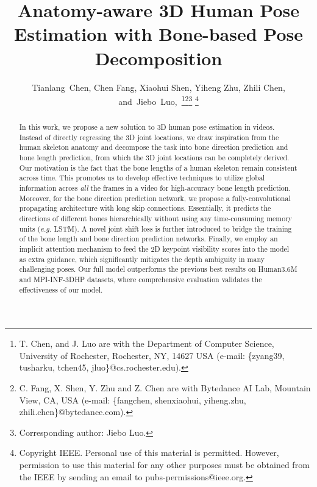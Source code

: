 \documentclass[journal]{IEEEtran}
\begin{document}
\title{Anatomy-aware 3D Human Pose Estimation with Bone-based Pose Decomposition}
\author{Tianlang~Chen, Chen Fang, Xiaohui Shen, Yiheng Zhu, Zhili Chen, and~Jiebo~Luo,~\thanks{T. Chen, and J. Luo are with the Department of Computer Science, University of Rochester, Rochester, NY, 14627 USA (e-mail: \{zyang39, tusharku, tchen45, jluo\}@cs.rochester.edu).}\thanks{C. Fang, X. Shen, Y. Zhu and Z. Chen are with Bytedance AI Lab, Mountain View, CA, USA (e-mail: \{fangchen, shenxiaohui, yiheng.zhu, zhili.chen\}@bytedance.com).}\thanks{Corresponding author: Jiebo Luo.}
\thanks{Copyright IEEE. Personal use of this material is permitted. However, permission to use this material for any other purposes must be obtained from the IEEE by sending an email to pubs-permissions@ieee.org.}
}





















\maketitle

\begin{abstract}
    In this work, we propose a new solution to 3D human pose estimation in videos. Instead of directly regressing the 3D joint locations, we draw inspiration from the human skeleton anatomy and decompose the task into bone direction prediction and bone length prediction, from which the 3D joint locations can be completely derived. Our motivation is the fact that the bone lengths of a human skeleton remain consistent across time. This 
promotes us to develop effective techniques to utilize global information across {\it all} the frames in a video for high-accuracy bone length prediction. Moreover, for the bone direction prediction network, we propose a fully-convolutional propagating architecture with long skip connections. Essentially, it predicts the directions of different bones hierarchically without using any time-consuming memory units (\emph{e.g.} LSTM). A novel joint shift loss is further introduced to bridge the training of the bone length and bone direction prediction networks. Finally, we employ an implicit attention mechanism to feed the 2D keypoint visibility scores into the model as extra guidance, which significantly mitigates the depth ambiguity in many challenging poses. Our full model outperforms the previous best results on Human3.6M and MPI-INF-3DHP datasets, where comprehensive evaluation validates the effectiveness of our model. \end{abstract}
\end{document}
